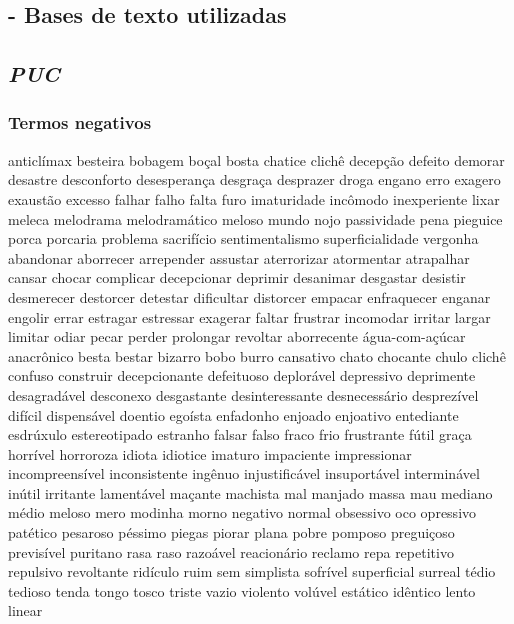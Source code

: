 \begin{appendices}
\chapter{- Bases de texto utilizadas}
\section{\textit{PUC}}
\subsection{Termos negativos}
anticl\'{i}max besteira bobagem bo\c{c}al bosta chatice clich\^{e} decep\c{c}\~ao defeito demorar desastre desconforto desesperan\c{c}a desgra\c{c}a desprazer droga engano erro exagero exaust\~ao excesso falhar falho falta furo imaturidade inc\^{o}modo inexperiente lixar meleca melodrama melodram\'{a}tico meloso mundo nojo passividade pena pieguice porca porcaria problema sacrif\'{i}cio sentimentalismo superficialidade vergonha abandonar aborrecer arrepender assustar aterrorizar atormentar atrapalhar cansar chocar complicar decepcionar deprimir desanimar desgastar desistir desmerecer destorcer detestar dificultar distorcer empacar enfraquecer enganar engolir errar estragar estressar exagerar faltar frustrar incomodar irritar largar limitar odiar pecar perder prolongar revoltar aborrecente \'{a}gua-com-a\c{c}\'{u}car anacr\^{o}nico besta bestar bizarro bobo burro cansativo chato chocante chulo clich\^{e} confuso construir decepcionante defeituoso deplor\'{a}vel depressivo deprimente desagrad\'{a}vel desconexo desgastante desinteressante desnecess\'{a}rio desprez\'{i}vel dif\'{i}cil dispens\'{a}vel doentio ego\'{i}sta enfadonho enjoado enjoativo entediante esdr\'{u}xulo estereotipado estranho falsar falso fraco frio frustrante f\'{u}til gra\c{c}a horr\'{i}vel horroroza idiota idiotice imaturo impaciente impressionar incompreens\'{i}vel inconsistente ing\^{e}nuo injustific\'{a}vel insuport\'{a}vel intermin\'{a}vel in\'{u}til irritante lament\'{a}vel ma\c{c}ante machista mal manjado massa mau mediano m\'{e}dio meloso mero modinha morno negativo normal obsessivo oco opressivo pat\'{e}tico pesaroso p\'{e}ssimo piegas piorar plana pobre pomposo pregui\c{c}oso previs\'{i}vel puritano rasa raso razo\'{a}vel reacion\'{a}rio reclamo repa repetitivo repulsivo revoltante rid\'{i}culo ruim sem simplista sofr\'{i}vel superficial surreal t\'{e}dio tedioso tenda tongo tosco triste vazio violento vol\'{u}vel est\'{a}tico id\^{e}ntico lento linear 


\end{appendices}
